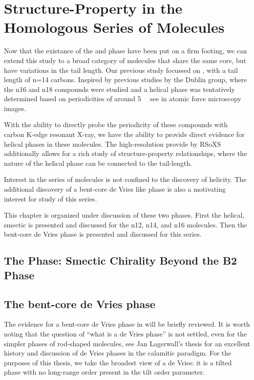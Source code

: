\documentclass[aagreenthesis]{subfiles}
\begin{document}
\chapter{Structure-Property in the \nfour{} Homologous Series of Molecules}

Now that the existance of the \smcpalpha{} and \smcapa{} phase have been put on
a firm footing, we can extend this study to a broad category of molecules that
share the same core, but have variations in the tail length. Our previous study
focussed on \nfour{}, with a tail length of n=14 carbons. Inspired by
previous studies by the Dublin
group\cite{SreenilayamSpontaneoushelixformation2016,SreenilayamDevelopmentferroelectricitysmectic2017,VijInvestigationheliconicalsmectic2019},
where the n16 and n18 compounds were studied and a helical phase was tentatively
determined based on periodicities of around \SI{5}{\nano\meters} see in atomic
force microscopy images.

With the ability to directly probe the periodicity of these compounds with
carbon K-edge resonant X-ray, we have the ability to provide direct evidence for
helical phases in these molecules. The high-resolution provide by RSoXS
additionally allows for a rich study of structure-property relationships, where
the nature of the helical phase can be connected to the tail-length.

Interest in the \nfour{} series of molecules is not confined to the discovery of
helicity. The additional discovery of a bent-core de Vries like phase is also a
motivating interest for study of this series. 

This chapter is organized under discussion of these two phases. First the
helical, smectic \smcpalpha{} is presented and discussed for the n12, n14, and n16 molecules.
Then the bent-core de Vries phase is presented and discussed for this series.

\section{The \smcpalpha{} Phase: Smectic Chirality Beyond the B2 Phase}


\section{The bent-core de Vries phase}

The evidence for a bent-core de Vries phase in \nfour{} will be briefly
reviewed. It is worth noting that the question of ``what is a de Vries phase''
is not settled, even for the simpler phases of rod-shaped molecules, see Jan
Lagerwall's thesis\cite{jansThesis} for an excellent history and discussion of
de Vries phases in the calamitic paradigm. For the purposes of this thesis, we
take the broadest view of a de Vries: it is a tilted phase with no long-range
order present in the tilt order parameter.
\end{document}
